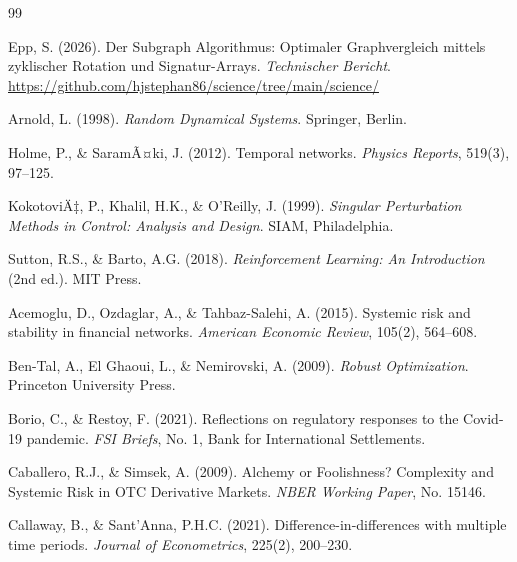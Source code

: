 ﻿\documentclass[a4paper,12pt]{article}
\theoremstyle{definition}
\begin{document}

\begin{thebibliography}{99}

Epp, S. (2026).
\newblock Der Subgraph Algorithmus: Optimaler Graphvergleich mittels zyklischer
          Rotation und Signatur-Arrays.
\newblock \emph{Technischer Bericht}.
\newblock \url{https://github.com/hjstephan86/science/tree/main/science/}

Arnold, L. (1998).
\newblock \emph{Random Dynamical Systems}.
\newblock Springer, Berlin.

Holme, P., \& SaramÃ¤ki, J. (2012).
\newblock Temporal networks.
\newblock \emph{Physics Reports}, 519(3), 97--125.

KokotoviÄ‡, P., Khalil, H.K., \& O'Reilly, J. (1999).
\newblock \emph{Singular Perturbation Methods in Control: Analysis and Design}.
\newblock SIAM, Philadelphia.

Sutton, R.S., \& Barto, A.G. (2018).
\newblock \emph{Reinforcement Learning: An Introduction} (2nd ed.).
\newblock MIT Press.

Acemoglu, D., Ozdaglar, A., \& Tahbaz-Salehi, A. (2015).
\newblock Systemic risk and stability in financial networks.
\newblock \emph{American Economic Review}, 105(2), 564--608.

Ben-Tal, A., El Ghaoui, L., \& Nemirovski, A. (2009).
\newblock \emph{Robust Optimization}.
\newblock Princeton University Press.

Borio, C., \& Restoy, F. (2021).
\newblock Reflections on regulatory responses to the Covid-19 pandemic.
\newblock \emph{FSI Briefs}, No. 1, Bank for International Settlements.

Caballero, R.J., \& Simsek, A. (2009).
\newblock Alchemy or Foolishness? Complexity and Systemic Risk in OTC Derivative Markets.
\newblock \emph{NBER Working Paper}, No. 15146.

Callaway, B., \& Sant'Anna, P.H.C. (2021).
\newblock Difference-in-differences with multiple time periods.
\newblock \emph{Journal of Econometrics}, 225(2), 200--230.


\end{thebibliography}
\end{document}
